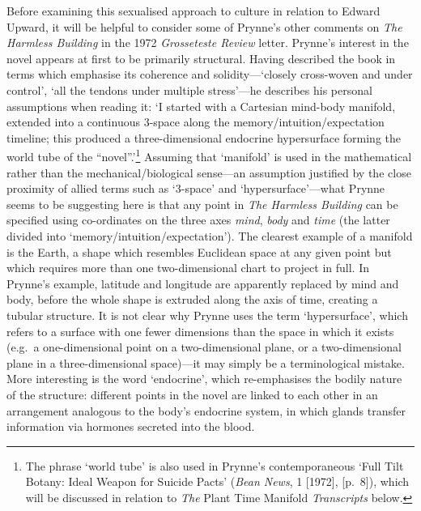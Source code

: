 \documentclass[]{article}
\begin{document}
Before examining this sexualised approach to culture in relation to
Edward Upward, it will be helpful to consider some of Prynne’s other
comments on \emph{The Harmless Building} in the 1972 \emph{Grosseteste
Review} letter. Prynne’s interest in the novel appears at first to be
primarily structural. Having described the book in terms which emphasise
its coherence and solidity—‘closely cross-woven and under control’, ‘all
the tendons under multiple stress’—he describes his personal assumptions
when reading it: ‘I started with a Cartesian mind-body manifold,
extended into a continuous 3-space along the
memory/intuition/expectation timeline; this produced a three-dimensional
endocrine hypersurface forming the world tube of the “novel”.’\footnote{The
  phrase ‘world tube’ is also used in Prynne’s contemporaneous ‘Full
  Tilt Botany: Ideal Weapon for Suicide Pacts’ (\emph{Bean News}, 1
  {[}1972{]}, {[}p.~8{]}), which will be discussed in relation to
  \emph{The} Plant Time Manifold \emph{Transcripts} below.} Assuming
that ‘manifold’ is used in the mathematical rather than the
mechanical/biological sense—an assumption justified by the close
proximity of allied terms such as ‘3-space’ and ‘hypersurface’—what
Prynne seems to be suggesting here is that any point in \emph{The
Harmless Building} can be specified using co-ordinates on the three axes
\emph{mind}, \emph{body} and \emph{time} (the latter divided into
‘memory/intuition/expectation’). The clearest example of a manifold is
the Earth, a shape which resembles Euclidean space at any given point
but which requires more than one two-dimensional chart to project in
full. In Prynne’s example, latitude and longitude are apparently
replaced by mind and body, before the whole shape is extruded along the
axis of time, creating a tubular structure. It is not clear why Prynne
uses the term ‘hypersurface’, which refers to a surface with one fewer
dimensions than the space in which it exists (e.g.~a one-dimensional
point on a two-dimensional plane, or a two-dimensional plane in a
three-dimensional space)—it may simply be a terminological mistake. More
interesting is the word ‘endocrine’, which re-emphasises the bodily
nature of the structure: different points in the novel are linked to
each other in an arrangement analogous to the body’s endocrine system,
in which glands transfer information via hormones secreted into the
blood.
\end{document}
